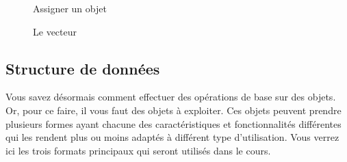 \documentclass[10.5pt,a4paper]{article}
\begin{document}
    \begin{figure}[H]
    \centering
    \caption{Assigner un objet}
    \label{struObj}
    \end{figure}
    
    \begin{figure}[H]
    \centering
    \caption{Le vecteur}
    \label{struVec1}
    \end{figure}
  
  \subsection{Structure de données}
  Vous savez désormais comment effectuer des opérations de base sur des objets. Or, pour ce faire, il vous faut des objets à exploiter. Ces objets peuvent prendre plusieurs formes ayant chacune des caractéristiques et fonctionnalités différentes qui les rendent plus ou moins adaptés à différent type d'utilisation. Vous verrez ici les trois formats principaux qui seront utilisés dans le cours. 
  
\end{document}
